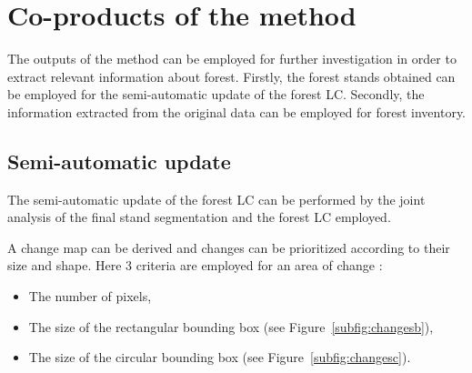 \section{Co-products of the method}
The outputs of the method can be employed for further investigation in order to extract relevant information about forest. Firstly, the forest stands obtained can be employed for the semi-automatic update of the forest LC. Secondly, the information extracted from the original data can be employed for forest inventory.
\subsection{Semi-automatic update}
The semi-automatic update of the forest LC can be performed by the joint analysis of the final stand segmentation and the forest LC employed.

A change map can be derived and changes can be prioritized according to their size and shape.
Here 3 criteria are employed for an area of change :
\begin{itemize}
\item The number of pixels,
\item The size of the rectangular bounding box (see Figure~\ref{subfig:changesb}),
\item The size of the circular bounding box (see Figure~\ref{subfig:changesc}).
\end{itemize}

